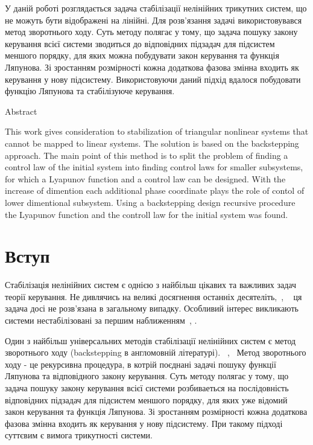\documentclass{article}
\begin{document}
У даній роботі розглядається задача стабілізації нелінійних трикутних систем, що не можуть бути відображені 
на лінійні. Для розв'язання задачі використовувався метод зворотнього ходу.
Суть методу полягає у тому, що задача пошуку закону керування всієї системи зводиться до 
відповідних підзадач для підсистем меншого порядку, для яких можна побудувати закон керування та функція Ляпунова.
Зі зростанням розмірності кожна додаткова фазова змінна входить як керування у нову підсистему. 
Використовуючи даний підхід вдалося побудовати функцію Ляпунова та стабілізуюче керування.

\begin{center}
    Abstract
\end{center}

This work gives consideration to stabilization of triangular nonlinear systems 
that cannot be mapped to linear systems. The solution is based on the backstepping approach.
The main point of this method is to split the problem of finding a control law of the initial system  into  
finding control laws for smaller subsystems, for which a Lyapunov function and a control law can be designed.
With the increase of dimention each additional phase coordinate plays the role of contol of lower dimentional 
subsystem.
Using a backstepping design recursive procedure the Lyapunov function and the controll law for the initial 
system was found.
\pagebreak

\tableofcontents
\pagebreak

\section{Вступ}

Стабілізація нелінійних систем є однією з найбільш цікавих та важливих задач теорії керування.
Не дивлячись на великі досягнення останніх десятеліть,~\cite{monoKorobov}, ~\cite{Khalil} 
ця задача досі не розв'язана в 
загальному випадку. Особливий інтерес викликають системи нестабілізовані за першим
наближенням~\cite{BebiyaKorobov}, \cite{Bebiya}.

Один з найбільш універсальних методів стабілізації нелінійних систем є метод зворотнього ходу 
(backstepping в англомовній літературі). ~\cite{Khalil},~\cite{backstepping}
 Метод зворотнього ходу - це рекурсивна процедура, в котрій поєднані задачі пошуку функції Ляпунова та відповідного закону
керування. Суть методу полягає у тому, що задача пошуку закону керування всієї системи розбиваеться на послідовність
відповідних підзадач для підсистем меншого порядку, для яких уже відомий закон керування та функція Ляпунова.
Зі зростанням розмірності кожна додаткова фазова змінна входить як керування у нову підсистему. 
При такому підході суттєвим є вимога трикутності системи.
\end{document}
